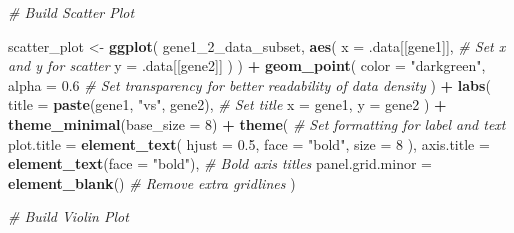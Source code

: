 \documentclass[
]{article}
\newenvironment{Shaded}{\begin{snugshade}}{\end{snugshade}}
\newcommand{\AttributeTok}[1]{\textcolor[rgb]{0.13,0.29,0.53}{#1}}
\newcommand{\CommentTok}[1]{\textcolor[rgb]{0.56,0.35,0.01}{\textit{#1}}}
\newcommand{\DecValTok}[1]{\textcolor[rgb]{0.00,0.00,0.81}{#1}}
\newcommand{\FloatTok}[1]{\textcolor[rgb]{0.00,0.00,0.81}{#1}}
\newcommand{\FunctionTok}[1]{\textcolor[rgb]{0.13,0.29,0.53}{\textbf{#1}}}
\newcommand{\NormalTok}[1]{#1}
\newcommand{\OtherTok}[1]{\textcolor[rgb]{0.56,0.35,0.01}{#1}}
\newcommand{\SpecialCharTok}[1]{\textcolor[rgb]{0.81,0.36,0.00}{\textbf{#1}}}
\newcommand{\StringTok}[1]{\textcolor[rgb]{0.31,0.60,0.02}{#1}}
\begin{document}
\begin{Shaded}
\begin{Highlighting}[]
  \CommentTok{\# Build Scatter Plot}
  
\NormalTok{  scatter\_plot }\OtherTok{\textless{}{-}} \FunctionTok{ggplot}\NormalTok{(}
\NormalTok{    gene1\_2\_data\_subset,}
      \FunctionTok{aes}\NormalTok{(}
        \AttributeTok{x =}\NormalTok{ .data[[gene1]], }\CommentTok{\# Set x and y for scatter }
        \AttributeTok{y =}\NormalTok{ .data[[gene2]]}
\NormalTok{      )}
\NormalTok{  ) }\SpecialCharTok{+}
    \FunctionTok{geom\_point}\NormalTok{(}
      \AttributeTok{color =} \StringTok{"darkgreen"}\NormalTok{,}
      \AttributeTok{alpha =} \FloatTok{0.6} \CommentTok{\# Set transparency for better readability of data density}
\NormalTok{  ) }\SpecialCharTok{+}
    \FunctionTok{labs}\NormalTok{(}
      \AttributeTok{title =} \FunctionTok{paste}\NormalTok{(gene1, }\StringTok{"vs"}\NormalTok{, gene2), }\CommentTok{\# Set title}
        \AttributeTok{x =}\NormalTok{ gene1,}
        \AttributeTok{y =}\NormalTok{ gene2}
\NormalTok{  ) }\SpecialCharTok{+}
  \FunctionTok{theme\_minimal}\NormalTok{(}\AttributeTok{base\_size =} \DecValTok{8}\NormalTok{) }\SpecialCharTok{+}
  \FunctionTok{theme}\NormalTok{( }\CommentTok{\# Set formatting for label and text}
    \AttributeTok{plot.title =} \FunctionTok{element\_text}\NormalTok{(}
      \AttributeTok{hjust =} \FloatTok{0.5}\NormalTok{,}
      \AttributeTok{face =} \StringTok{"bold"}\NormalTok{,}
      \AttributeTok{size =} \DecValTok{8}
\NormalTok{    ),}
    \AttributeTok{axis.title =} \FunctionTok{element\_text}\NormalTok{(}\AttributeTok{face =} \StringTok{"bold"}\NormalTok{), }\CommentTok{\# Bold axis titles}
    \AttributeTok{panel.grid.minor =} \FunctionTok{element\_blank}\NormalTok{() }\CommentTok{\# Remove extra gridlines}
\NormalTok{  )}
  
  \CommentTok{\# Build Violin Plot}


\end{Highlighting}
\end{Shaded}
\end{document}
